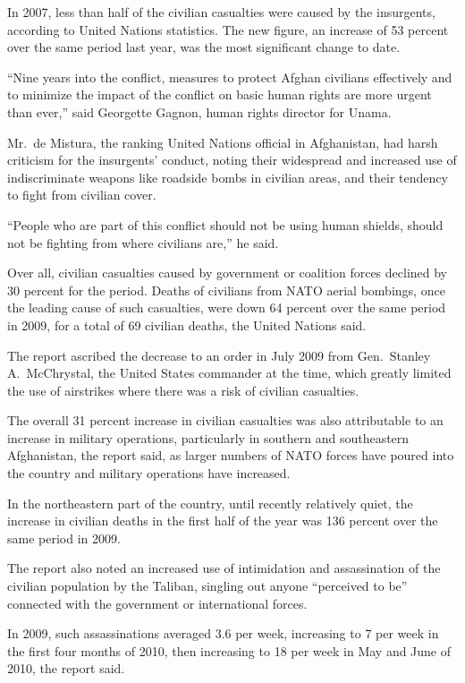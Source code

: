 ﻿\documentclass[12pt]{article}
\begin{document}
In 2007, less than half of the civilian casualties were caused by the insurgents, according to
United Nations statistics. The new figure, an increase of 53 percent over the same period last year,
was the most significant change to date.

``Nine years into the conflict, measures to protect Afghan civilians effectively and to minimize the
impact of the conflict on basic human rights are more urgent than ever,'' said Georgette Gagnon,
human rights director for Unama.

Mr.~de Mistura, the ranking United Nations official in Afghanistan, had harsh criticism for the
insurgents' conduct, noting their widespread and increased use of indiscriminate weapons like
roadside bombs in civilian areas, and their tendency to fight from civilian cover.

``People who are part of this conflict should not be using human shields, should not be fighting
from where civilians are,'' he said.

Over all, civilian casualties caused by government or coalition forces declined by 30 percent for
the period. Deaths of civilians from NATO aerial bombings, once the leading cause of such
casualties, were down 64 percent over the same period in 2009, for a total of 69 civilian deaths,
the United Nations said.

The report ascribed the decrease to an order in July 2009 from Gen.~Stanley A.~McChrystal, the
United States commander at the time, which greatly limited the use of airstrikes where there was a
risk of civilian casualties.

The overall 31 percent increase in civilian casualties was also attributable to an increase in
military operations, particularly in southern and southeastern Afghanistan, the report said, as
larger numbers of NATO forces have poured into the country and military operations have increased.

In the northeastern part of the country, until recently relatively quiet, the increase in civilian
deaths in the first half of the year was 136 percent over the same period in 2009.

The report also noted an increased use of intimidation and assassination of the civilian population
by the Taliban, singling out anyone ``perceived to be'' connected with the government or
international forces.

In 2009, such assassinations averaged 3.6 per week, increasing to 7 per week in the first four
months of 2010, then increasing to 18 per week in May and June of 2010, the report said.
\end{document}
